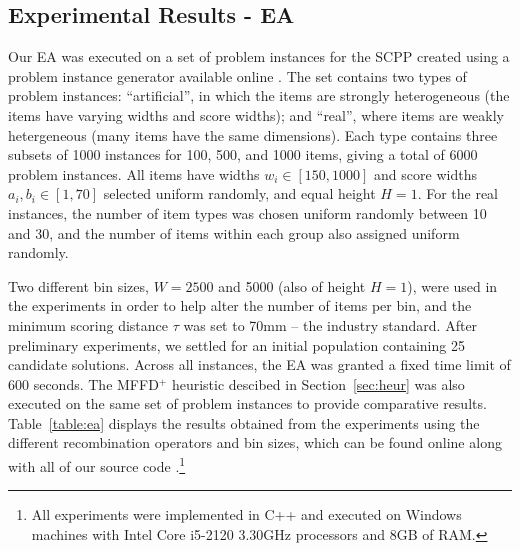 \documentclass[a4paper,11pt,authoryear]{elsarticle}
\begin{document}
\subsection{Experimental Results - EA}
\label{sub:expea}
\noindent Our EA was executed on a set of problem instances for the SCPP created using a problem instance generator available online \cite{hawa2019inst}. The set contains two types of problem instances: ``artificial'', in which the items are strongly heterogeneous (the items have varying widths and score widths); and ``real'', where items are weakly hetergeneous (many items have the same dimensions). Each type contains three subsets of 1000 instances for 100, 500, and 1000 items, giving a total of 6000 problem instances. All items have widths $w_i \in [150,1000]$ and score widths $a_i, b_i \in [1,70]$ selected uniform randomly, and equal height $H=1$. For the real instances, the number of item types was chosen uniform randomly between 10 and 30, and the number of items within each group also assigned uniform randomly.

Two different bin sizes, $W = 2500$ and 5000 (also of height $H=1$), were used in the experiments in order to help alter the number of items per bin, and the minimum scoring distance $\tau$ was set to 70mm -- the industry standard. After preliminary experiments, we settled for an initial population containing 25 candidate solutions. Across all instances, the EA was granted a fixed time limit of 600 seconds. The MFFD$^+$ heuristic descibed in Section~\ref{sec:heur} was also executed on the same set of problem instances to provide comparative results. Table~\ref{table:ea} displays the results obtained from the experiments using the different recombination operators and bin sizes, which can be found online along with all of our source code \cite{hawa2019ea}.\footnote{All experiments were implemented in C++ and executed on Windows machines with Intel Core i5-2120 3.30GHz processors and 8GB of RAM.}
\end{document}
